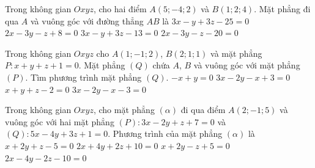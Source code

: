 \begin{ex}%
	Trong không gian $Oxyz$, cho hai điểm $A(5;-4;2)$ và $B(1;2;4)$. Mặt phẳng đi qua $A$ và vuông góc với đường thẳng $AB$ là
	\choice
	{$ 3x - y + 3z - 25 = 0 $}
	{$ 2x - 3y -z + 8 = 0 $}
	{$ 3x - y + 3z - 13 = 0 $}
	{\True $ 2x - 3y - z -20 = 0  $}
\end{ex}

\begin{ex}%
	Trong không gian $Oxyz$ cho $A \left(1;-1;2\right)$, $ B\left(2;1;1\right)$ và mặt phẳng
	$P\colon x+y+z+1=0$. Mặt phẳng $(Q)$ chứa $A$, $B$ và vuông góc với mặt phẳng $(P)$. Tìm phương trình mặt phẳng $(Q)$.
	\choice
	{$-x+y=0$}
	{$3x-2y-x+3=0$}
	{$x+y+z-2=0$}
	{\True $3x-2y-x-3=0$}
\end{ex}
\begin{ex}%
	Trong không gian $Oxyz$, cho mặt phẳng $(\alpha)$ đi qua điểm $A(2; -1; 5)$ và vuông góc với hai mặt phẳng $(P): 3x - 2y + z + 7 = 0$ và $(Q): 5x - 4y + 3z + 1 = 0$. Phương trình của mặt phẳng $(\alpha)$ là 
	\choice
	{\True $x + 2y + z - 5 = 0$}
	{$2x + 4y + 2z + 10 = 0$}
	{$x + 2y - z + 5 = 0$}
	{$2x - 4y - 2z - 10 = 0$}
\end{ex}


